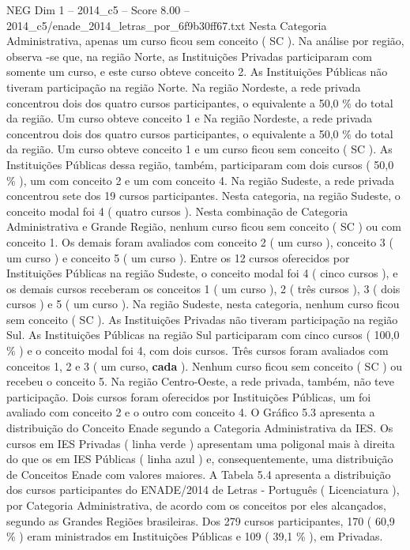 \begin{textsample}{NEG Dim 1 – 2014\_c5 – Score 8.00 – 2014\_c5/enade\_2014\_letras\_por\_6f9b30ff67.txt}
Nesta Categoria Administrativa, apenas um curso ficou sem conceito ( SC ).
Na análise por região, observa -se que, na região Norte, as Instituições Privadas participaram com somente um curso, e este curso obteve conceito 2.
As Instituições Públicas não tiveram participação na região Norte.
Na região Nordeste, a rede privada concentrou dois dos quatro cursos participantes, o equivalente a 50,0 \% do total da região.
Um curso obteve conceito 1 e Na região Nordeste, a rede privada concentrou dois dos quatro cursos participantes, o equivalente a 50,0 \% do total da região.
Um curso obteve conceito 1 e um curso ficou sem conceito ( SC ).
As Instituições Públicas dessa região, também, participaram com dois cursos ( 50,0 \% ), um com conceito 2 e um com conceito 4.
Na região Sudeste, a rede privada concentrou sete dos 19 cursos participantes.
Nesta categoria, na região Sudeste, o conceito modal foi 4 ( quatro cursos ).
Nesta combinação de Categoria Administrativa e Grande Região, nenhum curso ficou sem conceito ( SC ) ou com conceito 1.
Os demais foram avaliados com conceito 2 ( um curso ), conceito 3 ( um curso ) e conceito 5 ( um curso ).
Entre os 12 cursos oferecidos por Instituições Públicas na região Sudeste, o conceito modal foi 4 ( cinco cursos ), e os demais cursos receberam os conceitos 1 ( um curso ), 2 ( três cursos ), 3 ( dois cursos ) e 5 ( um curso ).
Na região Sudeste, nesta categoria, nenhum curso ficou sem conceito ( SC ).
As Instituições Privadas não tiveram participação na região Sul.
As Instituições Públicas na região Sul participaram com cinco cursos ( 100,0 \% ) e o conceito modal foi 4, com dois cursos.
Três cursos foram avaliados com conceitos 1, 2 e 3 ( um curso, \textbf{cada} ).
Nenhum curso ficou sem conceito ( SC ) ou recebeu o conceito 5.
Na região Centro-Oeste, a rede privada, também, não teve participação.
Dois cursos foram oferecidos por Instituições Públicas, um foi avaliado com conceito 2 e o outro com conceito 4.
O Gráfico 5.3 apresenta a distribuição do Conceito Enade segundo a Categoria Administrativa da IES.
Os cursos em IES Privadas ( linha verde ) apresentam uma poligonal mais à direita do que os em IES Públicas ( linha azul ) e, consequentemente, uma distribuição de Conceitos Enade com valores maiores.
A Tabela 5.4 apresenta a distribuição dos cursos participantes do ENADE/2014 de Letras - Português ( Licenciatura ), por Categoria Administrativa, de acordo com os conceitos por eles alcançados, segundo as Grandes Regiões brasileiras.
Dos 279 cursos participantes, 170 ( 60,9 \% ) eram ministrados em Instituições Públicas e 109 ( 39,1 \% ), em Privadas.

\end{textsample}
